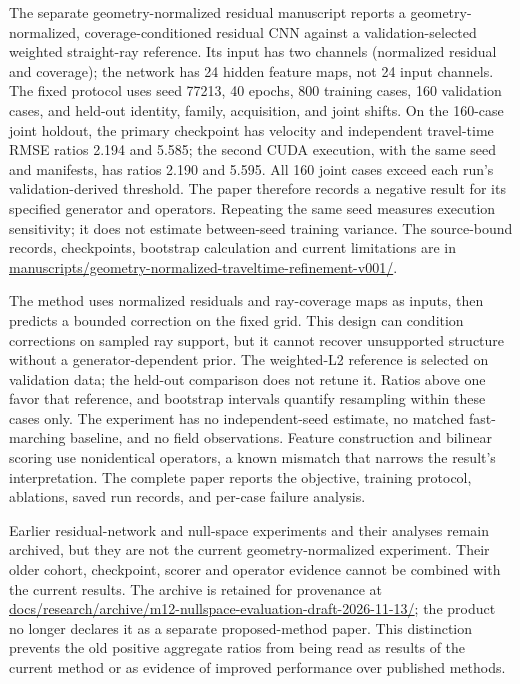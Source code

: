 The separate geometry-normalized residual manuscript reports a geometry-normalized,
coverage-conditioned residual CNN against a validation-selected weighted
straight-ray reference. Its input has two channels (normalized residual
and coverage); the network has 24 hidden feature maps, not 24 input
channels. The fixed protocol uses seed 77213, 40 epochs, 800 training
cases, 160 validation cases, and held-out identity, family, acquisition,
and joint shifts. On the 160-case joint holdout, the primary checkpoint
has velocity and independent travel-time RMSE ratios 2.194 and 5.585;
the second CUDA execution, with the same seed and manifests, has ratios
2.190 and 5.595. All 160 joint cases exceed each run's
validation-derived threshold. The paper therefore records a negative
result for its specified generator and operators. Repeating the same
seed measures execution sensitivity; it does not estimate
between-seed training variance. The source-bound records, checkpoints,
bootstrap calculation and current limitations are in
\url{manuscripts/geometry-normalized-traveltime-refinement-v001/}.

The method uses normalized residuals and ray-coverage maps as inputs,
then predicts a bounded correction on the fixed grid. This design can
condition corrections on sampled ray support, but it cannot recover
unsupported structure without a generator-dependent prior. The
weighted-L2 reference is selected on validation data; the held-out
comparison does not retune it. Ratios above one favor that reference,
and bootstrap intervals quantify resampling within these cases only.
The experiment has no independent-seed estimate, no matched fast-marching
baseline, and no field observations. Feature construction and bilinear
scoring use nonidentical operators, a known mismatch that narrows the
result's interpretation. The complete paper reports the objective,
training protocol, ablations, saved run records, and per-case failure analysis.

Earlier residual-network and null-space experiments and their analyses remain
archived, but they are not the current geometry-normalized experiment. Their older
cohort, checkpoint, scorer and operator evidence cannot be combined with
the current results. The archive is retained for provenance at
\url{docs/research/archive/m12-nullspace-evaluation-draft-2026-11-13/};
the product no longer declares it as a separate proposed-method paper.
This distinction prevents the old positive aggregate ratios from being
read as results of the current method or as evidence of improved
performance over published methods.

